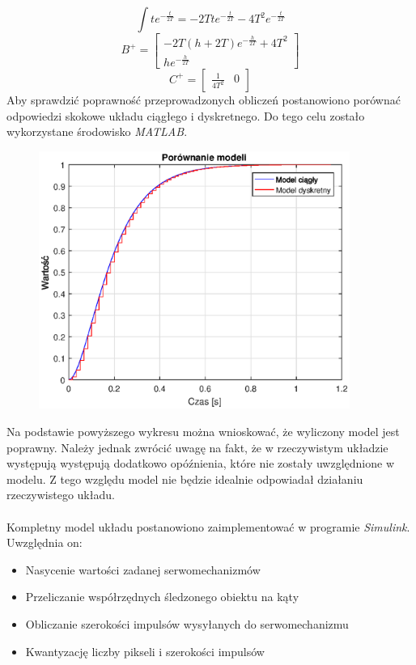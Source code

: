 \begin{equation}
\int te^{-\frac{t}{2T}}=-2Tte^{-\frac{t}{2T}}-4T^2e^{-\frac{t}{2T}}
\end{equation}
\begin{equation}
B^+=
	\begin{bmatrix}
	-2T(h+2T)e^{-\frac{h}{2T}}+4T^2 \\
	he^{-\frac{h}{2T}}
	\end{bmatrix}
\end{equation}
\begin{equation}
C^+=
	\begin{bmatrix}
	\frac{1}{4T^2} & 0
	\end{bmatrix}
\end{equation}
Aby sprawdzić poprawność przeprowadzonych obliczeń postanowiono porównać odpowiedzi skokowe układu ciągłego i dyskretnego. Do tego celu zostało wykorzystane środowisko \textit{MATLAB}.

\begin{figure}[h]
	\centering
	\includegraphics[width=4in]{comp.eps}
\end{figure}

Na podstawie powyższego wykresu można wnioskować, że wyliczony model jest poprawny. Należy jednak zwrócić uwagę na fakt, że w rzeczywistym układzie występują występują dodatkowo opóźnienia, które nie zostały uwzględnione w modelu. Z tego względu model nie będzie idealnie odpowiadał działaniu rzeczywistego układu.

\paragraph*{}
Kompletny model układu postanowiono zaimplementować w programie \textit{Simulink}. Uwzględnia on:
\begin{itemize}
\item Nasycenie wartości zadanej serwomechanizmów
\item Przeliczanie współrzędnych śledzonego obiektu na kąty
\item Obliczanie szerokości impulsów wysyłanych do serwomechanizmu
\item Kwantyzację liczby pikseli i szerokości impulsów
\end{itemize}


